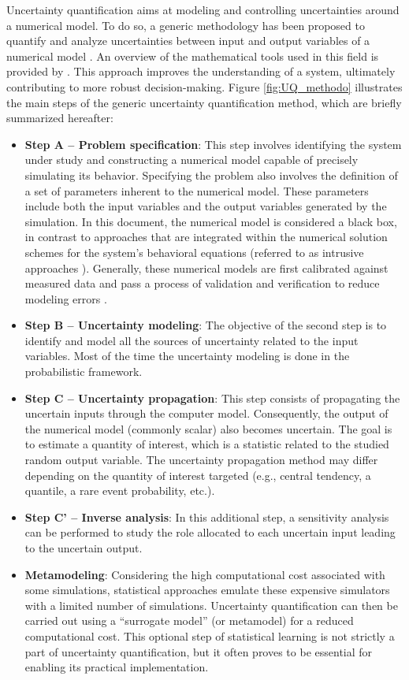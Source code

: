 Uncertainty quantification aims at modeling and controlling uncertainties around a numerical model. 
To do so, a generic methodology has been proposed to quantify and analyze uncertainties between input and output variables of a numerical model \citep{rocquigny_2008}. 
An overview of the mathematical tools used in this field is provided by \citet{sullivan_2015}. 
This approach improves the understanding of a system, ultimately contributing to more robust decision-making. 
Figure \ref{fig:UQ_methodo} illustrates the main steps of the generic uncertainty quantification method, which are briefly summarized hereafter: 
\begin{itemize}
    \item \textbf{Step A -- Problem specification}:     
    This step involves identifying the system under study and constructing a numerical model capable of precisely simulating its behavior. 
    Specifying the problem also involves the definition of a set of parameters inherent to the numerical model. 
    These parameters include both the input variables and the output variables generated by the simulation. 
    In this document, the numerical model is considered a black box, in contrast to approaches that are integrated within the numerical solution schemes for the system's behavioral equations (referred to as intrusive approaches \citep{lemaitre_2010}). 
    Generally, these numerical models are first calibrated against measured data and pass a process of validation and verification to reduce modeling errors \citep{oberkampf_2010_VVUQ}.  
    \item \textbf{Step B -- Uncertainty modeling}: 
    The objective of the second step is to identify and model all the sources of uncertainty related to the input variables. 
    Most of the time the uncertainty modeling is done in the probabilistic framework.
    \item \textbf{Step C -- Uncertainty propagation}:
    This step consists of propagating the uncertain inputs through the computer model.  
    Consequently, the output of the numerical model (commonly scalar) also becomes uncertain. 
    The goal is to estimate a quantity of interest, which is a statistic related to the studied random output variable. 
    The uncertainty propagation method may differ depending on the quantity of interest targeted (e.g., central tendency, a quantile, a rare event probability, etc.).    
    \item \textbf{Step C' -- Inverse analysis}: 
    In this additional step, a sensitivity analysis can be performed to study the role allocated to each uncertain input leading to the uncertain output. 
    \item \textbf{Metamodeling}: 
    Considering the high computational cost associated with some simulations, statistical approaches emulate these expensive simulators with a limited number of simulations. 
    Uncertainty quantification can then be carried out using a ``surrogate model'' (or metamodel) for a reduced computational cost. 
    This optional step of statistical learning is not strictly a part of uncertainty quantification, but it often proves to be essential for enabling its practical implementation.
\end{itemize}


